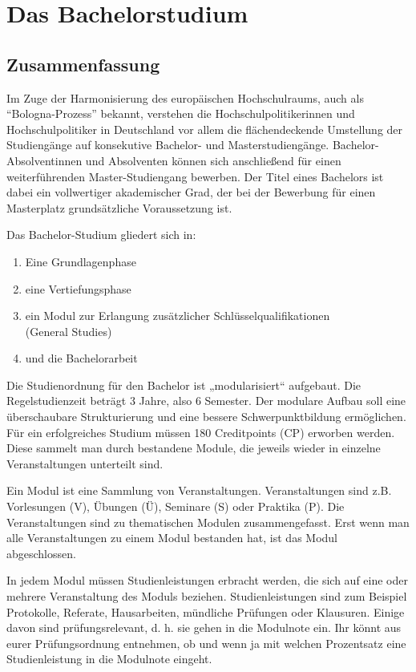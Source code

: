 \chapter{Das Bachelorstudium}
\section{Zusammenfassung}
Im Zuge der Harmonisierung des europäischen Hochschulraums, auch als "`Bologna-Prozess"' bekannt, verstehen die Hochschulpolitikerinnen und Hochschulpolitiker in Deutschland vor allem die flächendeckende Umstellung der Studiengänge auf konsekutive Bachelor- und Masterstudiengänge. Bachelor-Absolventinnen und Absolventen können sich anschließend für einen weiterführenden Master-Studiengang bewerben. Der Titel eines Bachelors ist dabei ein vollwertiger akademischer Grad, der bei der Bewerbung für einen Masterplatz grundsätzliche Voraussetzung ist. 

Das Bachelor-Studium gliedert sich in:
\begin{enumerate}
 \item Eine Grundlagenphase
 \item eine Vertiefungsphase
 \item ein Modul zur Erlangung zusätzlicher Schlüsselqualifikationen \\(General Studies)
 \item und die Bachelorarbeit
\end{enumerate}
Die Studienordnung für den Bachelor ist „modularisiert“ aufgebaut. Die Regelstudienzeit beträgt 3 Jahre, also 6 Semester. Der modulare Aufbau soll eine überschaubare Strukturierung und eine bessere Schwerpunktbildung ermöglichen. Für ein erfolgreiches Studium müssen 180 Creditpoints (CP) erworben werden. Diese sammelt man durch bestandene Module, die jeweils wieder in einzelne Veranstaltungen unterteilt sind.

Ein Modul ist eine Sammlung von Veranstaltungen. Veranstaltungen sind z.B. Vorlesungen (V), Übungen (Ü), Seminare (S) oder Praktika (P). Die Veranstaltungen sind zu thematischen Modulen zusammengefasst. Erst wenn man alle Veranstaltungen zu einem Modul bestanden hat, ist das Modul abgeschlossen.

In jedem Modul müssen Studienleistungen erbracht werden, die sich auf eine oder mehrere Veranstaltung des Moduls beziehen. Studienleistungen sind zum Beispiel Protokolle, Referate, Hausarbeiten, mündliche Prüfungen oder Klausuren. Einige davon sind prüfungsrelevant, d. h. sie gehen in die Modulnote ein. Ihr könnt aus eurer Prüfungsordnung entnehmen, ob und wenn ja mit welchen Prozentsatz eine Studienleistung in die Modulnote eingeht.

